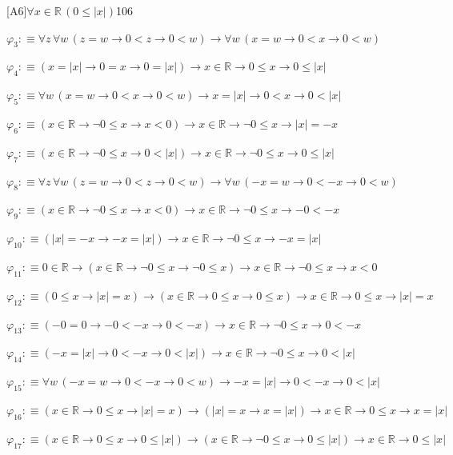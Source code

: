 \begin{fullproof}{[A6]}{$\forall x \in \mathbb{R}\,(0 \leq \lvert x \rvert)$}{106}
\begin{abbrevlist}
\item $\varphi_{3} :\equiv \forall z\,\forall w\,(z = w \to 0 < z \to 0 < w) \to \forall w\,(x = w \to 0 < x \to 0 < w)$
\item $\varphi_{4} :\equiv (x = \lvert x \rvert \to 0 = x \to 0 = \lvert x \rvert) \to x \in \mathbb{R} \to 0 \leq x \to 0 \leq \lvert x \rvert$
\item $\varphi_{5} :\equiv \forall w\,(x = w \to 0 < x \to 0 < w) \to x = \lvert x \rvert \to 0 < x \to 0 < \lvert x \rvert$
\item $\varphi_{6} :\equiv (x \in \mathbb{R} \to \neg 0 \leq x \to x < 0) \to x \in \mathbb{R} \to \neg 0 \leq x \to \lvert x \rvert = -x$
\item $\varphi_{7} :\equiv (x \in \mathbb{R} \to \neg 0 \leq x \to 0 < \lvert x \rvert) \to x \in \mathbb{R} \to \neg 0 \leq x \to 0 \leq \lvert x \rvert$
\item $\varphi_{8} :\equiv \forall z\,\forall w\,(z = w \to 0 < z \to 0 < w) \to \forall w\,(-x = w \to 0 < -x \to 0 < w)$
\item $\varphi_{9} :\equiv (x \in \mathbb{R} \to \neg 0 \leq x \to x < 0) \to x \in \mathbb{R} \to \neg 0 \leq x \to -0 < -x$
\item $\varphi_{10} :\equiv (\lvert x \rvert = -x \to -x = \lvert x \rvert) \to x \in \mathbb{R} \to \neg 0 \leq x \to -x = \lvert x \rvert$
\item $\varphi_{11} :\equiv 0 \in \mathbb{R} \to (x \in \mathbb{R} \to \neg 0 \leq x \to \neg 0 \leq x) \to x \in \mathbb{R} \to \neg 0 \leq x \to x < 0$
\item $\varphi_{12} :\equiv (0 \leq x \to \lvert x \rvert = x) \to (x \in \mathbb{R} \to 0 \leq x \to 0 \leq x) \to x \in \mathbb{R} \to 0 \leq x \to \lvert x \rvert = x$
\item $\varphi_{13} :\equiv (-0 = 0 \to -0 < -x \to 0 < -x) \to x \in \mathbb{R} \to \neg 0 \leq x \to 0 < -x$
\item $\varphi_{14} :\equiv (-x = \lvert x \rvert \to 0 < -x \to 0 < \lvert x \rvert) \to x \in \mathbb{R} \to \neg 0 \leq x \to 0 < \lvert x \rvert$
\item $\varphi_{15} :\equiv \forall w\,(-x = w \to 0 < -x \to 0 < w) \to -x = \lvert x \rvert \to 0 < -x \to 0 < \lvert x \rvert$
\item $\varphi_{16} :\equiv (x \in \mathbb{R} \to 0 \leq x \to \lvert x \rvert = x) \to (\lvert x \rvert = x \to x = \lvert x \rvert) \to x \in \mathbb{R} \to 0 \leq x \to x = \lvert x \rvert$
\item $\varphi_{17} :\equiv (x \in \mathbb{R} \to 0 \leq x \to 0 \leq \lvert x \rvert) \to (x \in \mathbb{R} \to \neg 0 \leq x \to 0 \leq \lvert x \rvert) \to x \in \mathbb{R} \to 0 \leq \lvert x \rvert$

\end{abbrevlist}
\end{fullproof}
